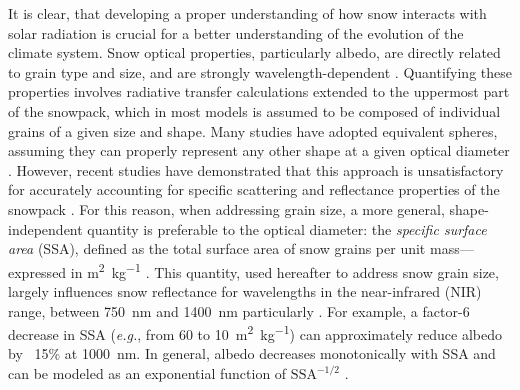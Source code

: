 \documentclass[11pt,a4paper]{article}
\newcommand{\eg}{\emph{e.g.}, }
\newcommand{\ssaunit}{\meter\squared\per\kilo\gram}
\newcommand{\ssa}{\mathrm{SSA}}
\begin{document}
	It is clear, that developing a proper understanding of how snow interacts with solar radiation is crucial for a better understanding of the evolution of the climate system. Snow optical properties, particularly albedo, are directly related to grain type and size, and are strongly wavelength-dependent \parencite{kokhanovskyScatteringOpticsSnow2004, bohrenTheoryOpticalProperties1974}. Quantifying these properties involves radiative transfer calculations extended to the uppermost part of the snowpack, which in most models is assumed to be composed of individual grains of a given size and shape. Many studies have adopted equivalent spheres, assuming they can properly represent any other shape at a given optical diameter \parencite{bohrenTheoryOpticalProperties1974, warrenSnowDepthArctic1999}. However, recent studies have demonstrated that this approach is unsatisfactory for accurately accounting for specific scattering and reflectance properties of the snowpack \parencite{kokhanovskyScatteringOpticsSnow2004, liboisExperimentalDeterminationAbsorption2014, dumontHighaccuracyMeasurementsSnow2010}. For this reason, when addressing grain size, a more general, shape-independent quantity is preferable to the optical diameter: the \emph{specific surface area} (SSA), defined as the total surface area of snow grains per unit mass---expressed in \unit{\meter\squared\per\kilo\gram} \parencite{internationalunionofpureandappliedchemistryiupacSpecificSurfaceArea}. This quantity, used hereafter to address snow grain size, largely influences snow reflectance for wavelengths in the near-infrared (NIR) range, between \qty{750}{\nano\meter} and \qty{1400}{\nano\meter} particularly \parencite{warrenModelSpectralAlbedo1980}. For example, a factor-6 decrease in SSA (\eg from 60 to \qty{10}{\ssaunit}) can approximately reduce albedo by ~15\% at \qty{1000}{\nm}. In general, albedo decreases monotonically with SSA and can be modeled as an exponential function of $\ssa^{-1/2}$ \parencite{kokhanovskyScatteringOpticsSnow2004}.
	
\end{document}
